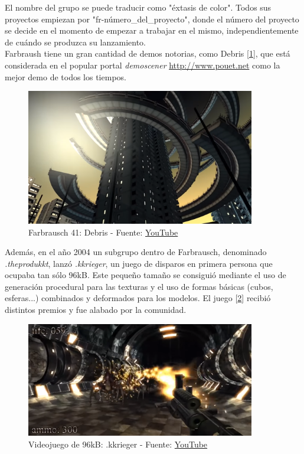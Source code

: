 El nombre del grupo se puede traducir como "éxtasis de color". Todos sus proyectos empiezan por "fr-número\_del\_proyecto", donde el número del proyecto se decide en el momento de empezar a trabajar en el mismo, independientemente de cuándo se produzca su lanzamiento.\\

Farbraush tiene un gran cantidad de demos notorias, como Debris [\ref{fig:debris}], que está considerada en el popular portal \emph{demoscener} \url{http://www.pouet.net} como la mejor demo de todos los tiempos.

\begin{figure}[h]
	\centering
	\includegraphics[width=10cm]{archivos/fr-041-debris}
	\caption{Farbrausch 41: Debris - Fuente: \href{https://www.youtube.com/watch?v=jY5Vrc5G0lk}{YouTube}}
	\label{fig:debris}
\end{figure}

Además, en el año 2004 un subgrupo dentro de Farbrausch, denominado \emph{.theprodukkt}, lanzó \emph{.kkrieger}, un juego de disparos en primera persona que ocupaba tan sólo 96kB. Este pequeño tamaño se consiguió mediante el uso de generación procedural para las texturas y el uso de formas básicas (cubos, esferas...) combinados y deformados para los modelos. El juego [\ref{fig:kkrieger}] recibió distintos premios y fue alabado por la comunidad.\\

\begin{figure}[h]
	\centering
	\includegraphics[width=10cm]{archivos/kkrieger}
	\caption{Videojuego de 96kB: .kkrieger - Fuente: \href{https://www.youtube.com/watch?v=2NBG-sKFaB0}{YouTube}}
	\label{fig:kkrieger}
\end{figure}

